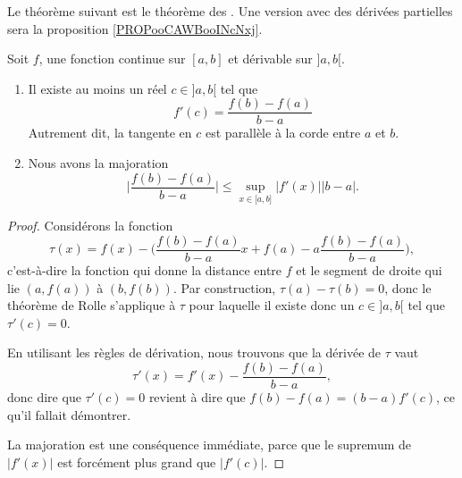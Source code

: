 Le théorème suivant est le théorème des . Une version avec des dérivées partielles sera la proposition \ref{PROPooCAWBooINcNxj}.
\begin{theorem}       \label{ThoAccFinis}
    Soit $f$, une fonction continue sur $[a,b]$ et dérivable sur $]a,b[$.
        \begin{enumerate}
            \item       \label{ITEMooFZONooXJqLyX}
               Il existe au moins un réel $c\in]a,b[$ tel que
                   \begin{equation}
                       f'(c)=\frac{ f(b)-f(a) }{ b-a }
                   \end{equation}
                   Autrement dit, la tangente en \( c\) est parallèle à la corde entre \( a\) et \( b\).
               \item       \label{ITEMooXRQKooDBFpdQ}
               Nous avons la majoration
               \begin{equation}
                   \big| \frac{ f(b)-f(a) }{ b-a } \big| \leq \sup_{x\in\mathopen[ a , b \mathclose]}| f'(x) |  | b-a |.
               \end{equation}
        \end{enumerate}
\end{theorem}

\begin{proof}
    Considérons la fonction
    \begin{equation}
        \tau(x)=f(x)-\big( \frac{ f(b)-f(a) }{ b-a }x + f(a) - a\frac{ f(b)-f(a) }{ b-a } \big),
    \end{equation}
    c'est-à-dire la fonction qui donne la distance entre $f$ et le segment de droite qui lie $(a,f(a))$ à $(b,f(b))$. Par construction, $\tau(a)-\tau(b)=0$, donc le théorème de Rolle s'applique à $\tau$ pour laquelle il existe donc un $c\in]a,b[$ tel que $\tau'(c)=0$.

    En utilisant les règles de dérivation, nous trouvons que la dérivée de $\tau$ vaut
    \begin{equation}
        \tau'(x)= f'(x)-\frac{ f(b)-f(a) }{ b-a },
    \end{equation}
    donc dire que $\tau'(c)=0$ revient à dire que $f(b)-f(a)=(b-a)f'(c)$, ce qu'il fallait démontrer.

    La majoration est une conséquence immédiate, parce que le supremum de \( | f'(x) |\) est forcément plus grand que \( | f'(c) |\).
\end{proof}

